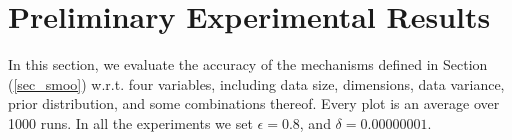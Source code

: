 \documentclass[sigconf, anonymous]{acmart}
\begin{document}




\section{Preliminary Experimental Results}
\label{sec_experiment}
In this section, we evaluate the accuracy of the mechanisms defined in
Section (\ref{sec_smoo}) w.r.t. four variables, including data size, dimensions,
data variance, prior distribution, and some combinations thereof.
Every plot is an average over 1000 runs. In all the experiments we set
$\epsilon = 0.8$, and $\delta = 0.00000001$.
\end{document}
